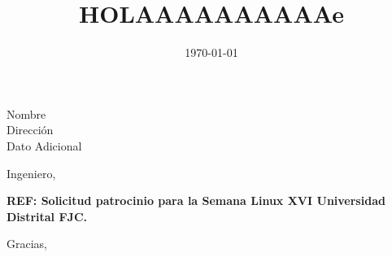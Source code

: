 \documentclass[11pt, twoside]{aletter}
\date{\today}
\title{HOLAAAAAAAAAAe}
\begin{document}

\renewcommand*{\makecopy}[2]{
\begin{letter}{#2}
\opening{#1}
\textbf{REF: Solicitud patrocinio para la Semana Linux XVI Universidad Distrital FJC.}

%

\vspace*{0mm} %
\closing{Gracias,
\vspace{0mm} %
}
\vspace*{0mm} %


\end{letter}
} %

\makecopy{Ingeniero,}{Nombre\\Direcci\'on\\Dato Adicional}

%
\end{document}
